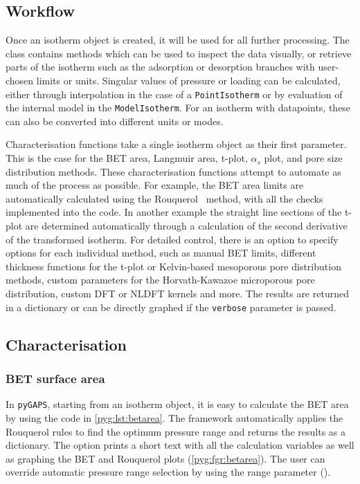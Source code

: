 \subsection{Workflow}

Once an isotherm object is created, it will be used for all 
further processing. The class contains methods which can be 
used to inspect the data visually, or retrieve
parts of the isotherm such as the adsorption or desorption branches with
user-chosen limits or units. Singular values of pressure or 
loading can be calculated, either through interpolation in the
case of a \texttt{PointIsotherm} or by evaluation
of the internal model in the \texttt{ModelIsotherm}. For an isotherm with
datapoints, these can also be converted into different units or modes.

Characterisation functions take a single isotherm object as their
first parameter. This is the case for the BET area, Langmuir area, 
t-plot, \(\alpha_s\) plot, and pore size distribution methods.
These characterisation functions attempt to automate as much
of the process as possible. For example, the BET area limits are
automatically calculated using the 
Rouquerol~\cite{rouquerolAdsorptionPowdersPorous2013} method, 
with all the checks implemented into the code. In another example
the straight line sections of the t-plot are determined automatically
through a calculation of the second derivative of the transformed isotherm.
For detailed control, there is an option to specify
options for each individual method, such as manual BET limits, 
different thickness functions for the t-plot or Kelvin-based 
mesoporous pore distribution methods, custom parameters for the
Horvath-Kawazoe microporous pore distribution, custom
DFT or NLDFT kernels and more. The results are returned in a 
dictionary or can be directly graphed if the \texttt{verbose} 
parameter is passed.


\subsection{Characterisation}

\subsubsection{BET surface area}

In \texttt{pyGAPS}, starting from an isotherm object, it is easy to
calculate the BET area by using the code in \autoref{pyg:lst:betarea}.
The framework automatically applies the Rouquerol rules to
find the optimum pressure range and returns the results as a
dictionary. The  option prints a short
text with all the calculation variables as well as graphing the
BET and Rouquerol plots (\autoref{pyg:fgr:betarea}).
The user can override
automatic pressure range selection by using the range parameter
().

